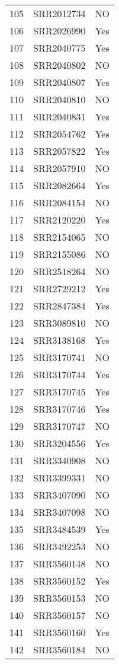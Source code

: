 \begin{longtable}{ccc}
  105 & SRR2012734 & NO \\ 
  106 & SRR2026990 & Yes \\ 
  107 & SRR2040775 & Yes \\ 
  108 & SRR2040802 & NO \\ 
  109 & SRR2040807 & Yes \\ 
  110 & SRR2040810 & NO \\ 
  111 & SRR2040831 & Yes \\ 
  112 & SRR2054762 & Yes \\ 
  113 & SRR2057822 & Yes \\ 
  114 & SRR2057910 & NO \\ 
  115 & SRR2082664 & Yes \\ 
  116 & SRR2084154 & NO \\ 
  117 & SRR2120220 & Yes \\ 
  118 & SRR2154065 & NO \\ 
  119 & SRR2155086 & NO \\ 
  120 & SRR2518264 & NO \\ 
  121 & SRR2729212 & Yes \\ 
  122 & SRR2847384 & Yes \\ 
  123 & SRR3089810 & NO \\ 
  124 & SRR3138168 & Yes \\ 
  125 & SRR3170741 & NO \\ 
  126 & SRR3170744 & Yes \\ 
  127 & SRR3170745 & Yes \\ 
  128 & SRR3170746 & Yes \\ 
  129 & SRR3170747 & NO \\ 
  130 & SRR3204556 & Yes \\ 
  131 & SRR3340908 & NO \\ 
  132 & SRR3399331 & NO \\ 
  133 & SRR3407090 & NO \\ 
  134 & SRR3407098 & NO \\ 
  135 & SRR3484539 & Yes \\ 
  136 & SRR3492253 & NO \\ 
  137 & SRR3560148 & NO \\ 
  138 & SRR3560152 & Yes \\ 
  139 & SRR3560153 & NO \\ 
  140 & SRR3560157 & NO \\ 
  141 & SRR3560160 & Yes \\ 
  142 & SRR3560184 & NO \\ 

\end{longtable}
